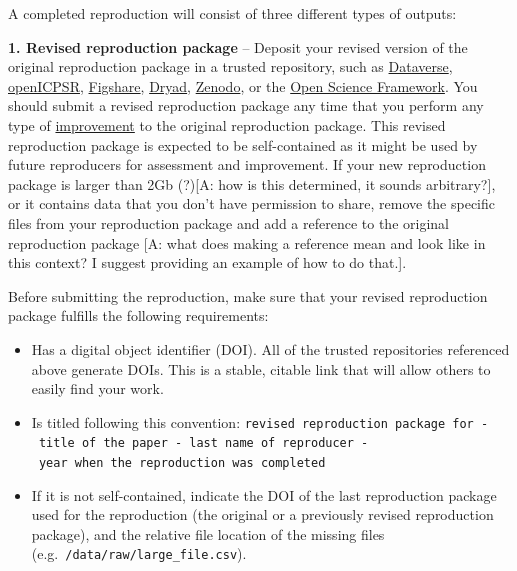 \documentclass[
]{book}
\providecommand{\tightlist}{%
  \setlength{\itemsep}{0pt}\setlength{\parskip}{0pt}}
\begin{document}
A completed reproduction will consist of three different types of outputs:

\textbf{1. Revised reproduction package} -- Deposit your revised version of the original reproduction package in a trusted repository, such as \href{https://dataverse.org/}{Dataverse}, \href{https://www.openicpsr.org/openicpsr/}{openICPSR}, \href{https://figshare.com}{Figshare}, \href{https://datadryad.org/stash}{Dryad}, \href{https://about.zenodo.org/}{Zenodo}, or the \href{osf.io/}{Open Science Framework}. You should submit a revised reproduction package any time that you perform any type of \protect\hyperlink{improvements}{improvement} to the original reproduction package. This revised reproduction package is expected to be self-contained as it might be used by future reproducers for assessment and improvement. If your new reproduction package is larger than 2Gb (?){[}A: how is this determined, it sounds arbitrary?{]}, or it contains data that you don't have permission to share, remove the specific files from your reproduction package and add a reference to the original reproduction package {[}A: what does making a reference mean and look like in this context? I suggest providing an example of how to do that.{]}.

Before submitting the reproduction, make sure that your revised reproduction package fulfills the following requirements:

\begin{itemize}
\tightlist
\item
  Has a digital object identifier (DOI). All of the trusted repositories referenced above generate DOIs. This is a stable, citable link that will allow others to easily find your work.
\item
  Is titled following this convention: \texttt{revised\ reproduction\ package\ for\ -\ title\ of\ the\ paper\ -\ last\ name\ of\ reproducer\ -\ year\ when\ the\ reproduction\ was\ completed}
\item
  If it is not self-contained, indicate the DOI of the last reproduction package used for the reproduction (the original or a previously revised reproduction package), and the relative file location of the missing files (e.g.~\texttt{/data/raw/large\_file.csv}).
\end{itemize}
\end{document}
